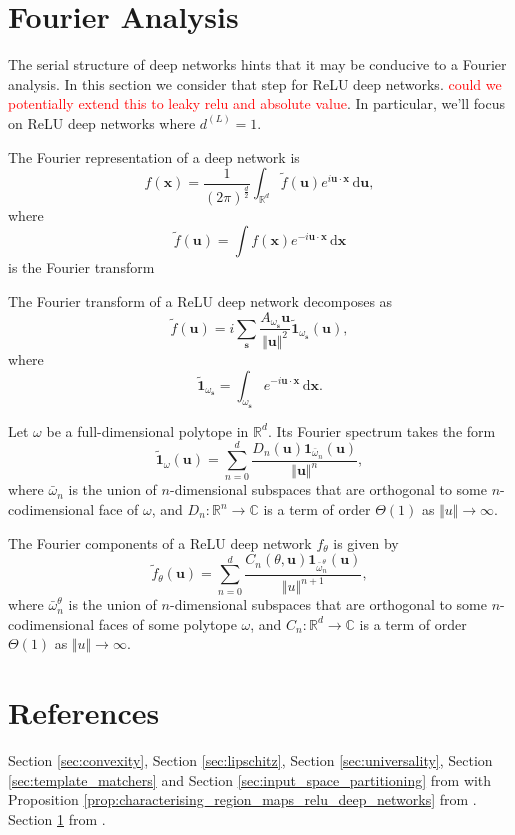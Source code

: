 \section{Fourier Analysis}\label{sec:fourier_analysis}

The serial structure of deep networks hints that it may be conducive to a Fourier analysis. In this section we consider that step for ReLU deep networks. \textcolor{Red}{could we potentially extend this to leaky relu and absolute value}. In particular, we'll focus on ReLU deep networks where $d^{(L)}=1$.

The Fourier representation of a deep network is $$f(\mathbf{x})=\frac{1}{\left(2\pi\right)^{\frac{d}{2}}}\int_{\mathbb{R}^d}\tilde{f}(\mathbf{u})e^{i\mathbf{u}\cdot\mathbf{x}}\,\mathrm{d}\mathbf{u},$$where$$\tilde{f}(\mathbf{u})=\int f(\mathbf{x})e^{-i\mathbf{u}\cdot\mathbf{x}}\,\mathrm{d}\mathbf{x}$$is the Fourier transform

\begin{lemma}
    The Fourier transform of a ReLU deep network decomposes as $$\tilde{f}(\mathbf{u})=i\sum_{\mathbf{s}}\frac{A_{\omega_\mathbf{s}}\mathbf{u}}{\Vert\mathbf{u}\Vert^2}\tilde{\mathbf{1}}_{\omega_\mathbf{s}}(\mathbf{u}),$$where $$\tilde{\mathbf{1}}_{\omega_\mathbf{s}}=\int_{\omega_\mathbf{s}}e^{-i\mathbf{u}\cdot\mathbf{x}}\,\mathrm{d}\mathbf{x}.$$
\end{lemma}

\begin{lemma}
    Let $\omega$ be a full-dimensional polytope in $\mathbb{R}^d$. Its Fourier spectrum takes the form $$\tilde{\mathbf{1}}_{\omega}(\mathbf{u})=\sum_{n=0}^d\frac{D_n(\mathbf{u})\mathbf{1}_{\bar{\omega}_n}(\mathbf{u})}{\Vert\mathbf{u}\Vert^n},$$where $\bar{\omega}_n$ is the union of $n$-dimensional subspaces that are orthogonal to some $n$-codimensional face of $\omega$, and $D_n:\mathbb{R}^n\to\mathbb{C}$ is a term of order $\Theta(1)$ as $\Vert u\Vert\to\infty$.
\end{lemma}

\begin{theorem}
    The Fourier components of a ReLU deep network $f_{\theta}$ is given by $$\tilde{f}_{\theta}(\mathbf{u})=\sum_{n=0}^d\frac{C_n(\theta,\mathbf{u})\mathbf{1}_{\bar{\omega}_n^{\theta}}(\mathbf{u})}{\Vert u\Vert^{n+1}},$$where $\bar{\omega}_n^{\theta}$ is the union of $n$-dimensional subspaces that are orthogonal to some $n$-codimensional faces of some polytope $\omega$, and $C_n:\mathbb{R}^d\to\mathbb{C}$ is a term of order $\Theta(1)$ as $\Vert u\Vert\to\infty$.
\end{theorem}


\section{References}

Section \ref{sec:convexity}, Section \ref{sec:lipschitz}, Section \ref{sec:universality}, Section \ref{sec:template_matchers} and Section \ref{sec:input_space_partitioning} from \citet{balestrieroMadMaxAffine2018} with Proposition \ref{prop:characterising_region_maps_relu_deep_networks} from \citet{humayunSplineCamExactVisualization2023}. Section \ref{sec:fourier_analysis} from \citet{rahamanSpectralBiasNeural2018}.